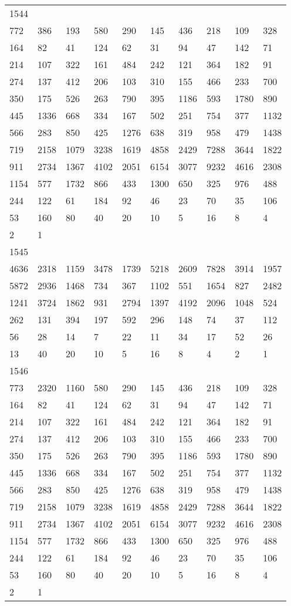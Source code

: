 \begin{longtable}{*{10}{l}}
1544&&&&&&&&&\\
772& 386& 193& 580& 290& 145& 436& 218& 109& 328\\
164& 82& 41& 124& 62& 31& 94& 47& 142& 71\\
214& 107& 322& 161& 484& 242& 121& 364& 182& 91\\
274& 137& 412& 206& 103& 310& 155& 466& 233& 700\\
350& 175& 526& 263& 790& 395& 1186& 593& 1780& 890\\
445& 1336& 668& 334& 167& 502& 251& 754& 377& 1132\\
566& 283& 850& 425& 1276& 638& 319& 958& 479& 1438\\
719& 2158& 1079& 3238& 1619& 4858& 2429& 7288& 3644& 1822\\
911& 2734& 1367& 4102& 2051& 6154& 3077& 9232& 4616& 2308\\
1154& 577& 1732& 866& 433& 1300& 650& 325& 976& 488\\
244& 122& 61& 184& 92& 46& 23& 70& 35& 106\\
53& 160& 80& 40& 20& 10& 5& 16& 8& 4\\
2& 1& \\

1545&&&&&&&&&\\
4636& 2318& 1159& 3478& 1739& 5218& 2609& 7828& 3914& 1957\\
5872& 2936& 1468& 734& 367& 1102& 551& 1654& 827& 2482\\
1241& 3724& 1862& 931& 2794& 1397& 4192& 2096& 1048& 524\\
262& 131& 394& 197& 592& 296& 148& 74& 37& 112\\
56& 28& 14& 7& 22& 11& 34& 17& 52& 26\\
13& 40& 20& 10& 5& 16& 8& 4& 2& 1\\

1546&&&&&&&&&\\
773& 2320& 1160& 580& 290& 145& 436& 218& 109& 328\\
164& 82& 41& 124& 62& 31& 94& 47& 142& 71\\
214& 107& 322& 161& 484& 242& 121& 364& 182& 91\\
274& 137& 412& 206& 103& 310& 155& 466& 233& 700\\
350& 175& 526& 263& 790& 395& 1186& 593& 1780& 890\\
445& 1336& 668& 334& 167& 502& 251& 754& 377& 1132\\
566& 283& 850& 425& 1276& 638& 319& 958& 479& 1438\\
719& 2158& 1079& 3238& 1619& 4858& 2429& 7288& 3644& 1822\\
911& 2734& 1367& 4102& 2051& 6154& 3077& 9232& 4616& 2308\\
1154& 577& 1732& 866& 433& 1300& 650& 325& 976& 488\\
244& 122& 61& 184& 92& 46& 23& 70& 35& 106\\
53& 160& 80& 40& 20& 10& 5& 16& 8& 4\\
2& 1& \\


\end{longtable}
